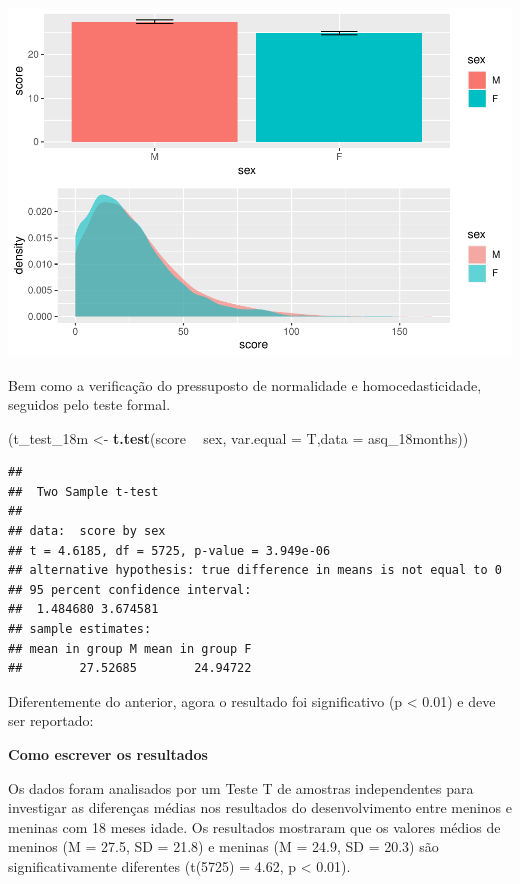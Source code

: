 \documentclass[
]{book}
\newenvironment{Shaded}{\begin{snugshade}}{\end{snugshade}}
\newcommand{\DataTypeTok}[1]{\textcolor[rgb]{0.13,0.29,0.53}{#1}}
\newcommand{\KeywordTok}[1]{\textcolor[rgb]{0.13,0.29,0.53}{\textbf{#1}}}
\newcommand{\NormalTok}[1]{#1}
\newcommand{\OperatorTok}[1]{\textcolor[rgb]{0.81,0.36,0.00}{\textbf{#1}}}
\newcommand{\StringTok}[1]{\textcolor[rgb]{0.31,0.60,0.02}{#1}}
\begin{document}
\begin{center}\includegraphics{gitbook-demo_files/figure-latex/unnamed-chunk-38-1} \end{center}

Bem como a verificação do pressuposto de normalidade e homocedasticidade, seguidos pelo teste formal.

\begin{Shaded}
\begin{Highlighting}[]
\NormalTok{(t_test_18m <-}\StringTok{ }\KeywordTok{t.test}\NormalTok{(score }\OperatorTok{~}\StringTok{ }\NormalTok{sex, }\DataTypeTok{var.equal =}\NormalTok{ T,}\DataTypeTok{data =}\NormalTok{ asq_18months))}
\end{Highlighting}
\end{Shaded}

\begin{verbatim}
## 
##  Two Sample t-test
## 
## data:  score by sex
## t = 4.6185, df = 5725, p-value = 3.949e-06
## alternative hypothesis: true difference in means is not equal to 0
## 95 percent confidence interval:
##  1.484680 3.674581
## sample estimates:
## mean in group M mean in group F 
##        27.52685        24.94722
\end{verbatim}

Diferentemente do anterior, agora o resultado foi significativo (p \textless{} 0.01) e deve ser reportado:

\begin{writing}
\textbf{Como escrever os resultados}

Os dados foram analisados por um Teste T de amostras independentes para
investigar as diferenças médias nos resultados do desenvolvimento entre
meninos e meninas com 18 meses idade. Os resultados mostraram que os
valores médios de meninos (M = 27.5, SD = 21.8) e meninas (M = 24.9, SD
= 20.3) são significativamente diferentes (t(5725) = 4.62, p \textless{}
0.01).
\end{writing}
\end{document}
